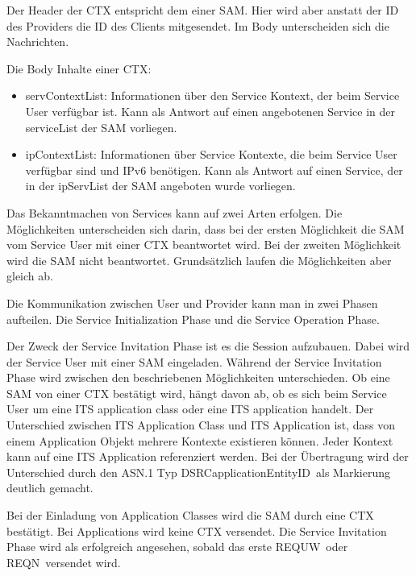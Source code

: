 Der Header der \ac{CTX} entspricht dem einer \ac{SAM}. Hier wird aber anstatt der \ac{ID} des Providers die \ac{ID} des Clients mitgesendet. Im Body unterscheiden sich die Nachrichten. 

Die Body Inhalte einer \ac{CTX}:
\begin{itemize}
	\item servContextList: Informationen über den Service Kontext, der beim Service User verfügbar ist. Kann als Antwort auf einen angebotenen Service in der serviceList der \ac{SAM} vorliegen.
	\item ipContextList: Informationen über Service Kontexte, die beim Service User verfügbar sind und IPv6 benötigen. Kann als Antwort auf einen Service, der in der ipServList der \ac{SAM} angeboten wurde vorliegen.
\end{itemize}  

Das Bekanntmachen von Services kann auf zwei Arten erfolgen. Die Möglichkeiten unterscheiden sich darin, dass bei der ersten Möglichkeit die \ac{SAM} vom Service User mit einer \ac{CTX} beantwortet wird. Bei der zweiten Möglichkeit wird die \ac{SAM} nicht beantwortet. Grundsätzlich laufen die Möglichkeiten aber gleich ab.  

Die Kommunikation zwischen User und Provider kann man in zwei Phasen aufteilen. Die Service Initialization Phase und die Service Operation Phase.

Der Zweck der Service Invitation Phase ist es die Session aufzubauen. Dabei wird der Service User mit einer \ac{SAM} eingeladen. Während der Service Invitation Phase wird zwischen den beschriebenen Möglichkeiten unterschieden. Ob eine \ac{SAM} von einer \ac{CTX} bestätigt wird, hängt davon ab, ob es sich beim Service User um eine \ac{ITS} application class oder eine \ac{ITS} application handelt. Der Unterschied zwischen \ac{ITS} Application Class und \ac{ITS} Application ist, dass von einem Application Objekt mehrere Kontexte existieren können. Jeder Kontext kann auf eine \ac{ITS} Application referenziert werden. Bei der Übertragung wird der Unterschied durch  den \ac{ASN.1} Typ \glqq DSRCapplicationEntityID\grqq~als Markierung deutlich gemacht. 

Bei der Einladung von Application Classes wird die \ac{SAM} durch eine \ac{CTX} bestätigt. Bei Applications wird keine \ac{CTX} versendet. Die Service Invitation Phase wird als erfolgreich angesehen, sobald das erste \glqq REQUW\grqq~oder \glqq REQN\grqq~versendet wird. 

